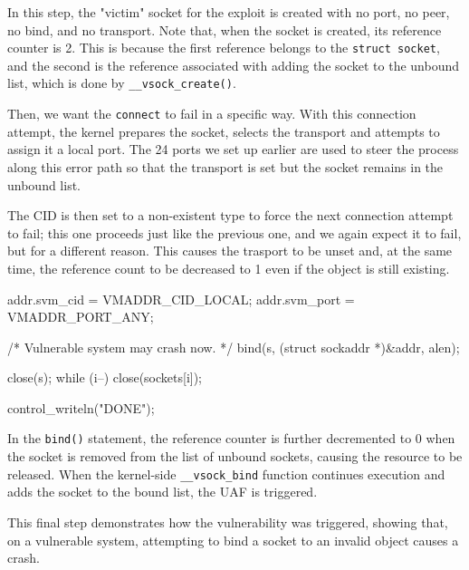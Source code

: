 \noindent In this step, the "victim" socket for the exploit is created with no port, no peer, no bind, and no transport. Note that, when the socket is created, its reference counter is 2. This is because the first reference belongs to the \texttt{struct socket}, and the second is the reference associated with adding the socket to the unbound list, which is done by \texttt{\_\_vsock\_create()}.

Then, we want the \texttt{connect} to fail in a specific way. With this connection attempt, the kernel prepares the socket, selects the transport and attempts to assign it a local port. The 24 ports we set up earlier are used to steer the process along this error path so that the transport is set but the socket remains in the unbound list.


\noindent The CID is then set to a non-existent type to force the next connection attempt to fail; this one proceeds just like the previous one, and we again expect it to fail, but for a different reason.
This causes the trasport to be unset and, at the same time, the reference count to be decreased to 1 even if the object is still existing.

\begin{clncode}[firstnumber=54]
    addr.svm_cid = VMADDR_CID_LOCAL;
    addr.svm_port = VMADDR_PORT_ANY;
    
    /* Vulnerable system may crash now. */
    bind(s, (struct sockaddr *)&addr, alen);
    
    close(s);
    while (i--)
        close(sockets[i]);
        
    control_writeln("DONE");
\end{clncode}

\noindent In the \texttt{bind()} statement, the reference counter is further decremented to 0 when the socket is removed from the list of unbound sockets, causing the resource to be released. When the kernel-side \texttt{\_\_vsock\_bind} function continues execution and adds the socket to the bound list, the UAF is triggered.

This final step demonstrates how the vulnerability was triggered, showing that, on a vulnerable system, attempting to bind a socket to an invalid object causes a crash. 

